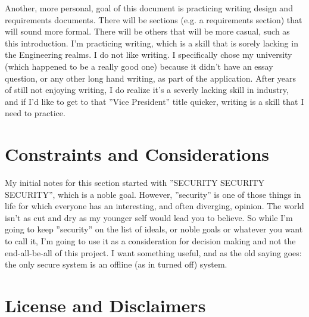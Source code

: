 \documentclass[letterpaper,twoside,12pt]{book}
\begin{document}
Another, more personal, goal of this document is practicing writing design and requirements documents.  There will be
sections (e.g. a requirements section) that will sound more formal.  There will be others that will be more casual, such
as this introduction.  I'm practicing writing, which is a skill that is sorely lacking in the Engineering realms.  I do
not like writing.  I specifically chose my university (which happened to be a really good one) because it didn't have an
essay question, or any other long hand writing, as part of the application.  After years of still not enjoying writing,
I do realize it's a severly lacking skill in industry, and if I'd like to get to that ''Vice President'' title quicker,
writing is a skill that I need to practice.

\section{Constraints and Considerations}

My initial notes for this section started with ''SECURITY SECURITY SECURITY'', which is a noble goal.  However,
''security'' is one of those things in life for which everyone has an interesting, and often diverging, opinion.  The
world isn't as cut and dry as my younger self would lead you to believe.  So while I'm going to keep ''security'' on the
list of ideals, or noble goals or whatever you want to call it, I'm going to use it as a consideration for decision
making and not the end-all-be-all of this project.  I want something useful, and as the old saying goes: the only secure
system is an offline (as in turned off) system.


\section{License and Disclaimers}




\end{document}
